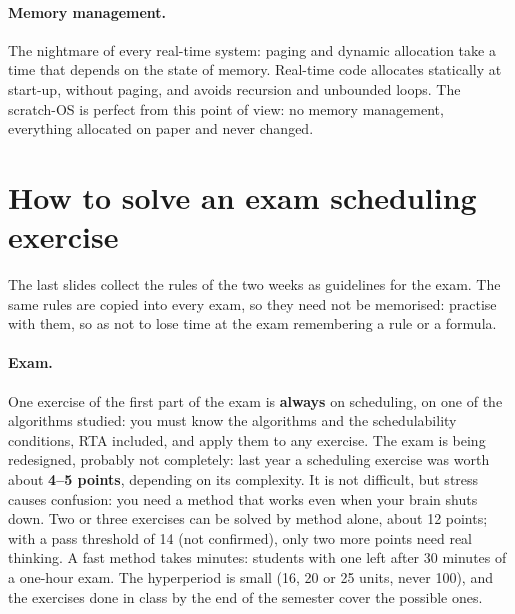 \paragraph{Memory management.} The nightmare of every real-time system: paging and dynamic allocation take a time that depends on the state of memory. Real-time code allocates statically at start-up, without paging, and avoids recursion and unbounded loops. The scratch-OS is perfect from this point of view: no memory management, everything allocated on paper and never changed.

\section{How to solve an exam scheduling exercise}
The last slides collect the rules of the two weeks as guidelines for the exam. The same rules are copied into every exam, so they need not be memorised: practise with them, so as not to lose time at the exam remembering a rule or a formula.

\paragraph{Exam.} One exercise of the first part of the exam is \textbf{always} on scheduling, on one of the algorithms studied: you must know the algorithms and the schedulability conditions, RTA included, and apply them to any exercise. The exam is being redesigned, probably not completely: last year a scheduling exercise was worth about \textbf{4--5 points}, depending on its complexity. It is not difficult, but stress causes confusion: you need a method that works even when your brain shuts down. Two or three exercises can be solved by method alone, about 12 points; with a pass threshold of 14 (not confirmed), only two more points need real thinking. A fast method takes minutes: students with one left after 30 minutes of a one-hour exam. The hyperperiod is small (16, 20 or 25 units, never 100), and the exercises done in class by the end of the semester cover the possible ones.


